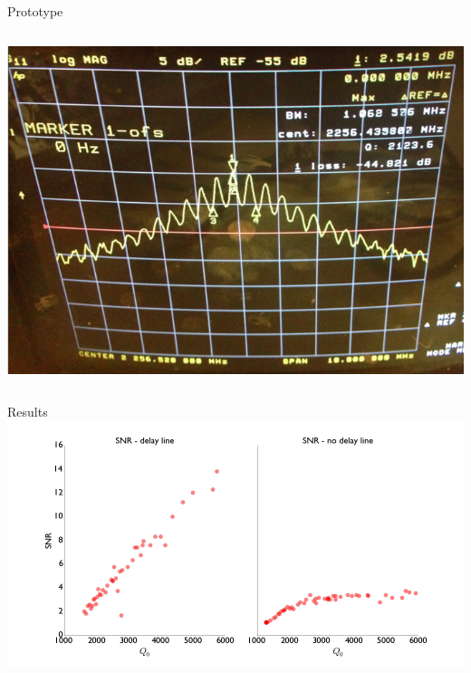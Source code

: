 \documentclass{beamer}
\begin{document}
\begin{frame}{Prototype}
\begin{columns}
\includegraphics[width=\textwidth]{s21_delay}
\end{columns}

\end{frame}

\begin{frame}{Results}
\includegraphics[width=\textwidth]{summary_plots}
\end{frame}
\end{document}
